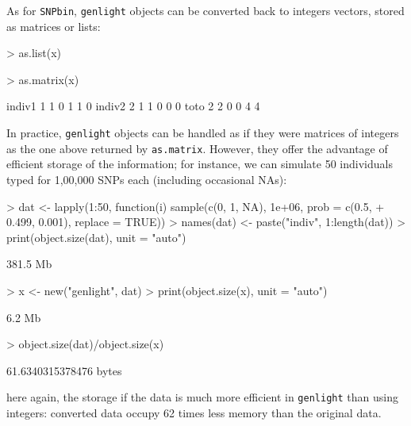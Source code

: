 \documentclass{article}
\begin{document}
As for \texttt{SNPbin}, \texttt{genlight} objects can be converted back to integers vectors, stored
as matrices or lists:
\begin{Schunk}
\begin{Sinput}
> as.list(x)
\end{Sinput}
\begin{Sinput}
> as.matrix(x)
\end{Sinput}
\begin{Soutput}
       [,1] [,2] [,3] [,4] [,5] [,6]
indiv1    1    1    0    1    1    0
indiv2    2    1    1    0    0    0
toto      2    2    0    0    4    4
\end{Soutput}
\end{Schunk}

\noindent In practice, \texttt{genlight} objects can be handled as if they were matrices of integers
as the one above returned by \texttt{as.matrix}.
However, they offer the advantage of efficient storage of the information; for instance, we can
simulate 50 individuals typed for 1,00,000 SNPs each (including occasional NAs):
\begin{Schunk}
\begin{Sinput}
> dat <- lapply(1:50, function(i) sample(c(0, 1, NA), 1e+06, prob = c(0.5, 
+     0.499, 0.001), replace = TRUE))
> names(dat) <- paste("indiv", 1:length(dat))
> print(object.size(dat), unit = "auto")
\end{Sinput}
\begin{Soutput}
381.5 Mb
\end{Soutput}
\begin{Sinput}
> x <- new("genlight", dat)
> print(object.size(x), unit = "auto")
\end{Sinput}
\begin{Soutput}
6.2 Mb
\end{Soutput}
\begin{Sinput}
> object.size(dat)/object.size(x)
\end{Sinput}
\begin{Soutput}
61.6340315378476 bytes
\end{Soutput}
\end{Schunk}
here again, the storage if the data is much more efficient in \texttt{genlight} than using integers: converted data occupy
62 times less memory than the original data.
\\
\end{document}
